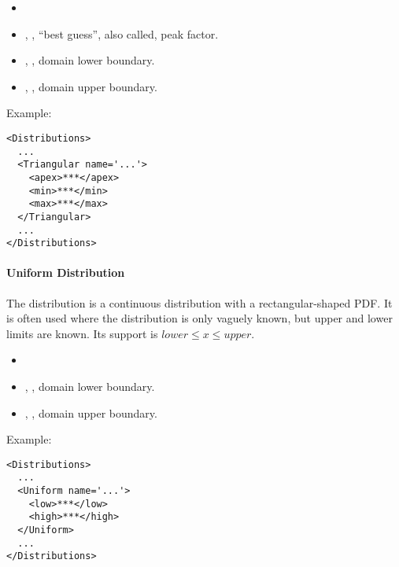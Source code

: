 %
\attrIntro
\vspace{-5mm}
\begin{itemize}
\itemsep0em
\item \nameDescription
\end{itemize}
\vspace{-5mm}
\subnodesIntro
\begin{itemize}
\item {}, , ``best guess'', also
  called, peak factor.
\item {}, , domain lower boundary.
\item {}, , domain upper boundary.
\end{itemize}

Example:
\begin{lstlisting}[style=XML]
<Distributions>
  ...
  <Triangular name='...'>
    <apex>***</apex>
    <min>***</min>
    <max>***</max>
  </Triangular>
  ...
</Distributions>
\end{lstlisting}

\paragraph{Uniform Distribution}
\label{Uniform}
The  distribution is a continuous distribution with a
rectangular-shaped PDF.
%
It is often used where the distribution is only vaguely known, but upper and
lower limits are known.
%
Its support is $lower \le x \le upper$.

%
\attrIntro
\vspace{-5mm}
\begin{itemize}
\itemsep0em
\item \nameDescription
\end{itemize}
\vspace{-5mm}
\subnodesIntro
\begin{itemize}
\item {}, , domain lower boundary.
\item {}, , domain upper
  boundary.
\end{itemize}

Example:
\begin{lstlisting}[style=XML]
<Distributions>
  ...
  <Uniform name='...'>
    <low>***</low>
    <high>***</high>
  </Uniform>
  ...
</Distributions>
\end{lstlisting}

